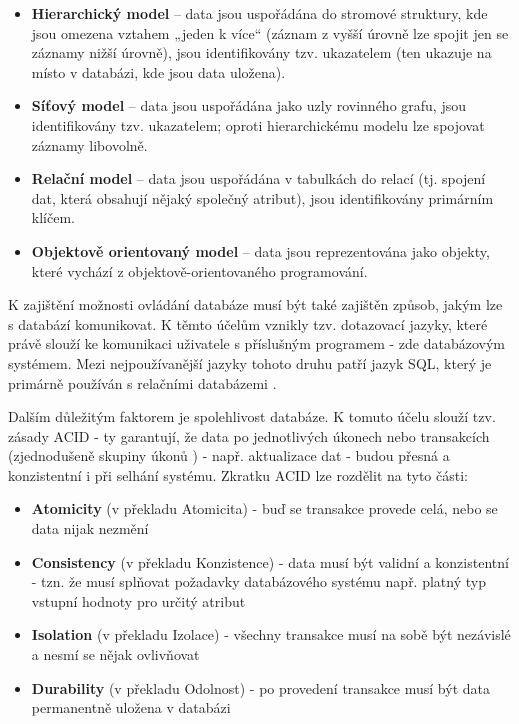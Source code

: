 	\begin{itemize}
		\item \textbf{Hierarchický model} – data jsou uspořádána do stromové struktury, kde jsou omezena vztahem „jeden k více“ (záznam z vyšší úrovně lze spojit jen se záznamy nižší úrovně), jsou identifikovány tzv. ukazatelem (ten ukazuje na místo v databázi, kde jsou data uložena). \cite{HierarchDB}
		\item \textbf{Síťový model} – data jsou uspořádána jako uzly rovinného grafu, jsou identifikovány tzv. ukazatelem; oproti hierarchickému modelu lze spojovat záznamy libovolně. \cite{SitDB} 
		\item \textbf{Relační model} – data jsou uspořádána v tabulkách do relací (tj. spojení dat, která obsahují nějaký společný atribut), jsou identifikovány primárním klíčem. \cite{RelacDB}
		\item \textbf{Objektově orientovaný model} – data jsou reprezentována jako objekty, které vychází z objektově-orientovaného programování. \cite{OOPDB}
	\end{itemize}
	
	K zajištění možnosti ovládání databáze musí být také zajištěn způsob, jakým lze s databází komunikovat. K těmto účelům vznikly tzv. dotazovací jazyky, které právě slouží ke komunikaci uživatele s příslušným programem \cite{DotazJazyk} - zde databázovým systémem. Mezi nejpoužívanější jazyky tohoto druhu patří jazyk SQL, který je primárně používán s relačními databázemi \cite{SQL}.
	
	Dalším důležitým faktorem je spolehlivost databáze. K tomuto účelu slouží tzv. zásady ACID - ty garantují, že data po jednotlivých úkonech nebo transakcích (zjednodušeně skupiny úkonů \cite{Transakce}) - např. aktualizace dat - budou přesná a konzistentní i při selhání systému. Zkratku ACID lze rozdělit na tyto části:
	
	\begin{itemize}
		\item \textbf{Atomicity} (v překladu Atomicita) - buď se transakce provede celá, nebo se data nijak nezmění
		\item \textbf{Consistency} (v překladu Konzistence) - data musí být validní a konzistentní - tzn. že musí splňovat požadavky databázového systému např. platný typ vstupní hodnoty pro určitý atribut
		\item \textbf{Isolation} (v překladu Izolace) - všechny transakce musí na sobě být nezávislé a nesmí se nějak ovlivňovat
		\item \textbf{Durability} (v překladu Odolnost) - po provedení transakce musí být data permanentně uložena v databázi
		\cite{ACID}
	\end{itemize}
	
